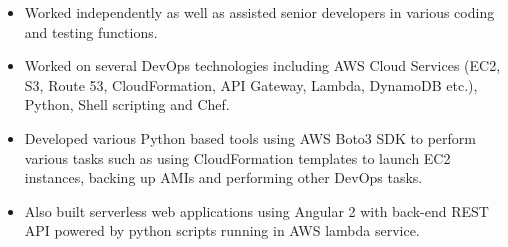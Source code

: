 \documentclass[10pt,a4paper,ragged2e]{maltacv}
\begin{document}
\divider

\begin{itemize}
  \item Worked independently as well as assisted senior developers in various coding and testing functions. 
  \item Worked on several DevOps technologies including AWS Cloud Services (EC2, S3, Route 53, CloudFormation, API Gateway, Lambda, DynamoDB etc.), Python, Shell scripting and Chef. 
  \item Developed various Python based tools using AWS Boto3 SDK to perform various tasks such as using CloudFormation templates to launch EC2 instances, backing up AMIs and performing other DevOps tasks. 
  \item Also built serverless web applications using Angular 2 with back-end REST API powered by python scripts running in AWS lambda service.
\end{itemize}

\divider
\medskip

\medskip
\begin{multicols}{3}


  \vfill\null
  \columnbreak


  \vfill\null
  \columnbreak

  \vfill\null
  \columnbreak

\end{multicols}

\medskip


\end{document}
